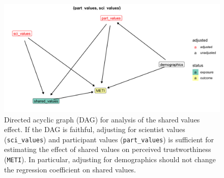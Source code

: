 \documentclass[
  letterpaper,
  DIV=11,
  numbers=noendperiod]{scrartcl}
\begin{document}
\begin{figure}

{\centering \includegraphics{fig3_shared_values_dag.png}

}

\caption{\label{fig-shared-dag}Directed acyclic graph (DAG) for analysis
of the shared values effect. If the DAG is faithful, adjusting for
scientist values (\texttt{sci\_values}) and participant values
(\texttt{part\_values}) is sufficient for estimating the effect of
shared values on perceived trustworthiness (\texttt{METI}). In
particular, adjusting for demographics should not change the regression
coefficient on shared values.}

\end{figure}
\end{document}
